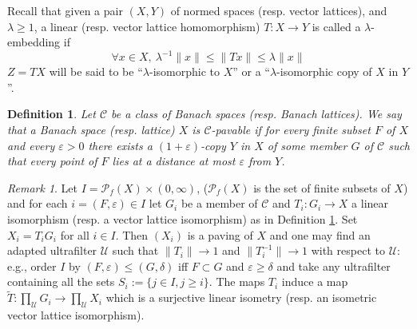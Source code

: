 \documentclass[11pt]{amsart}
\theoremstyle{plain}
\newtheorem{definition}[theorem]{Definition}
\theoremstyle{remark}
\newtheorem{remark}[theorem]{Remark}
\newcommand{\C}{\mathcal C}
\newcommand{\U}{\mathcal U}
\newcommand{\eps}{\varepsilon}
\begin{document}
\smallskip
Recall that given a pair $(X,Y)$ of normed spaces (resp. vector lattices), and $\lambda\ge 1$, a linear (resp. vector lattice homomorphism) $T: X\to Y$ is called a $\lambda$-embedding if 
$$\forall x\in X,\ \lambda^{-1}\|x\|\le\|Tx\|\le \lambda\|x\|$$
$Z=TX$ will be said to be ``$\lambda$-isomorphic to $X$'' or a ``$\lambda$-isomorphic copy of $X$ in 
$Y$''.
 
\begin{definition}\label{def:pavable}
Let $\C$ be a class of Banach spaces (resp. Banach lattices). We say that a Banach space (resp. lattice) $X$ is $\C$-pavable if for every  finite subset $F$ of $X$ and every $\eps>0$ there exists a $(1+\eps)$-copy $Y$ in $X$ of some member $G$ of $\C$ 
such that every point of $F$ lies at a distance at most $\eps$ from $Y$.
\end{definition}

\begin{remark}\label{rem: paving}
Let $I=\mathcal P_f(X)\times (0,\infty)$, ($\mathcal P_f(X)$ is the set of finite subsets of $X$) and for each $i=(F,\eps)\in I$ let $G_i$ be a member of $\C$ and $T_i:G_i\to X$ a linear isomorphism (resp. a vector lattice isomorphism) as in Definition \ref{def:pavable}. Set $X_i=T_iG_i$ for all $i\in I$. Then $(X_i)$ is a paving of $X$ and one may find an adapted ultrafilter $\U$ such that $\|T_i\|\to 1$ and $\|T_i^{-1}\|\to 1$ with respect to $\U$: e.g., order $I$ by $(F,\eps)\le (G,\delta)$ iff $F\subset G$ and $\eps\ge\delta$ and take any ultrafilter containing all the sets $S_i:=\{j\in I, j\ge i\}$. The maps $T_i$ induce a map $\tilde T:\prod_\U G_i\to \prod_\U X_i$ which is a surjective linear isometry (resp. an isometric vector lattice isomorphism).
\end{remark}
\end{document}
